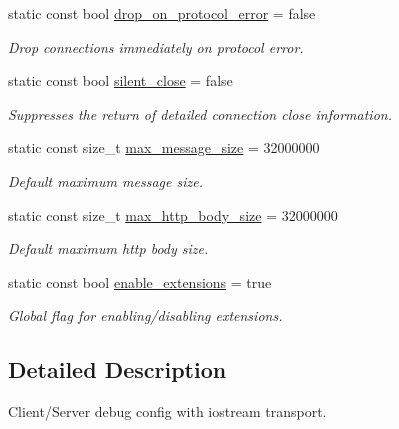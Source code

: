 \begin{DoxyCompactItemize}
\item 
static const bool \hyperlink{structwebsocketpp_1_1config_1_1debug__core_a0f046a730b161555c644dc40df9ea870}{drop\+\_\+on\+\_\+protocol\+\_\+error} = false
\begin{DoxyCompactList}\small\item\em Drop connections immediately on protocol error. \end{DoxyCompactList}\item 
static const bool \hyperlink{structwebsocketpp_1_1config_1_1debug__core_a961630bca024033059ef50863d1fc174}{silent\+\_\+close} = false
\begin{DoxyCompactList}\small\item\em Suppresses the return of detailed connection close information. \end{DoxyCompactList}\item 
static const size\+\_\+t \hyperlink{structwebsocketpp_1_1config_1_1debug__core_a2c46fa8d65f3a6a69ccec42bd0e91e20}{max\+\_\+message\+\_\+size} = 32000000
\begin{DoxyCompactList}\small\item\em Default maximum message size. \end{DoxyCompactList}\item 
static const size\+\_\+t \hyperlink{structwebsocketpp_1_1config_1_1debug__core_a95ea7d50bc0617bc447d98dca1ea7e0d}{max\+\_\+http\+\_\+body\+\_\+size} = 32000000
\begin{DoxyCompactList}\small\item\em Default maximum http body size. \end{DoxyCompactList}\item 
static const bool \hyperlink{structwebsocketpp_1_1config_1_1debug__core_a483b9b5f8929dddf7389f6a751400406}{enable\+\_\+extensions} = true\hypertarget{structwebsocketpp_1_1config_1_1debug__core_a483b9b5f8929dddf7389f6a751400406}{}\label{structwebsocketpp_1_1config_1_1debug__core_a483b9b5f8929dddf7389f6a751400406}

\begin{DoxyCompactList}\small\item\em Global flag for enabling/disabling extensions. \end{DoxyCompactList}\end{DoxyCompactItemize}


\subsection{Detailed Description}
Client/\+Server debug config with iostream transport. 

